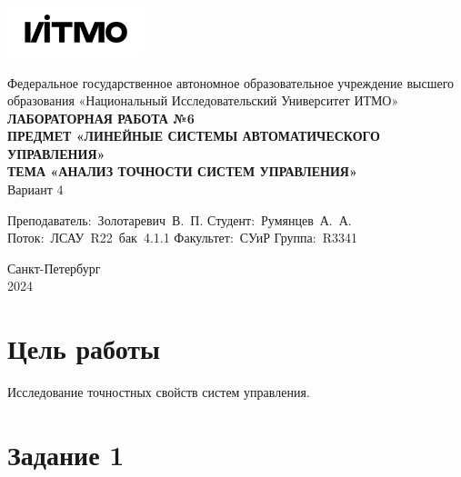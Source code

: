 \documentclass[a4paper, 12pt]{article}
\begin{document}
    \begin{titlepage}

        \begin{center}
        \includegraphics[width=0.3\textwidth]{itmo.png} %
        \vfill
        
        Федеральное государственное автономное образовательное учреждение высшего образования
        «Национальный Исследовательский Университет ИТМО»\\
        
        \vfill
        {\large\bf ЛАБОРАТОРНАЯ РАБОТА №6}\\
        {\large\bf ПРЕДМЕТ «ЛИНЕЙНЫЕ СИСТЕМЫ АВТОМАТИЧЕСКОГО УПРАВЛЕНИЯ»}\\
        {\large\bf ТЕМА «АНАЛИЗ ТОЧНОСТИ СИСТЕМ УПРАВЛЕНИЯ»}\\
        Вариант 4
        \vfill

        \begin{flushright}
            \begin{minipage}{.45\textwidth}
            {
                \hbox{Преподаватель: Золотаревич В. П.}
                \hbox{Студент: Румянцев А. А.}
                \hbox{Поток: ЛСАУ R22 бак 4.1.1}
                \hbox{}
                \hbox{Факультет: СУиР}
                \hbox{Группа: R3341}
            }
            \end{minipage}
        \end{flushright}
        
        \vfill
                
        Санкт-Петербург\\
        2024
        \end{center}
    \end{titlepage}
    
    \tableofcontents

    \newpage
    \section{Цель работы}
    Исследование точностных свойств систем управления.


    \section{Задание 1}
\end{document}
